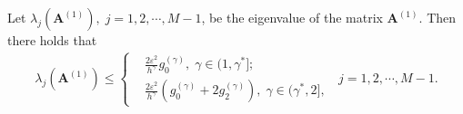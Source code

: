 \documentclass{siamart171218}
\numberwithin{theorem}{section}
\numberwithin{equation}{section}
\begin{document}
%

\begin{lemma}\label{Lem.3.9}
Let $\lambda_j\left({\mathbf{A}}^{(1)}\right),\;j=1,2,\cdots,M-1$, be the eigenvalue
of the matrix ${\mathbf{A}}^{(1)}$.
Then there holds that
\begin{align*}
\lambda_j\left({\mathbf{A}}^{(1)}\right)\leq
\left\{
\begin{aligned}
  &\frac{2\varepsilon^2}{h^\gamma} g_{0}^{(\gamma)},\;\gamma\in(1,\gamma^{*}];\\
 & \frac{2\varepsilon^2}{h^\gamma}\left(g_{0}^{(\gamma)}+2g_{2}^{(\gamma)}\right),\;
  \gamma\in(\gamma^{*},2],
\end{aligned}
\right.\;\;j=1,2,\cdots,M-1.
\end{align*}
\end{lemma}
\end{document}
